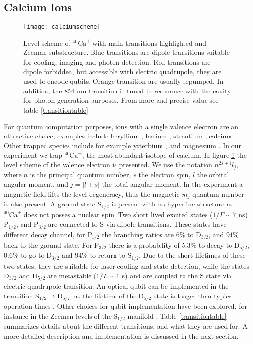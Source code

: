 \subsection{Calcium Ions}
\label{sec:calciumion}
\begin{figure}
\centering
\texttt{[image: calciumscheme]}
\caption{Level scheme of $^{40}\text{Ca}^+$ with main transitions highlighted and Zeeman substructure. Blue transitions are dipole transitions suitable for cooling, imaging and photon detection. Red transitions are dipole forbidden, but accessible with electric quadrupole, they are used to encode qubits. Orange transition are usually repumped. In addition, the 854 nm transition is tuned in resonance with the cavity for photon generation purposes. From more and precise value see table \ref{transitiontable}}
\label{calciumscheme}
\end{figure}
For quantum computation purposes, ions with a single valence electron are an attractive choice, examples include beryllium \cite{beryllium}, barium \cite{barium}, strontium \cite{strontium}, calcium \cite{calcium}. Other trapped species include for example ytterbium \cite{PhysRevA.44.R20}, and magnesium \cite{magnesium}. In our experiment we trap $^{40}\text{Ca}^+$, the most abundant isotope of calcium. In figure \ref{calciumscheme} the level scheme of the valence electron is presented. We use the notation $n^{2s+1}l_j$, where $n$ is the principal quantum number, $s$ the electron spin, $l$ the orbital angular moment, and $j = |l\pm s|$ the total angular moment. In the experiment a magnetic field lifts the level degeneracy, thus the magnetic $m_j$ quantum number is also present. A ground state $\text{S}_{1/2}$ is present with no hyperfine structure as $^{40}\text{Ca}^+$ does not posses a nuclear spin. Two short lived excited states ($1/\Gamma \sim 7$ ns) $\text{P}_{1/2}$, and $\text{P}_{3/2}$ are connected to S via dipole transitions. These states have different decay channel, for $\text{P}_{1/2}$ the branching ratios are $6\%$ to $\text{D}_{3/2}$, and $94\%$ back to the ground state.
For $\text{P}_{3/2}$ there is a probability of $5.3\%$ to decay to $\text{D}_{5/2}$, $0.6\%$ to go to  $\text{D}_{3/2}$ and $94\%$ to return to  $\text{S}_{1/2}$. Due to the short lifetimes of these two states, they are suitable for laser cooling and state detection, while the states $\text{D}_{3/2}$ and $\text{D}_{5/2}$
are metastable ($ 1/\Gamma \sim 1$ s) and are coupled to the S state via electric quadrupole transition. An optical qubit can be implemented in the transition $\text{S}_{1/2} \to \text{D}_{5/2}$, as the lifetime of the $\text{D}_{5/2}$ state is longer than typical operation times \cite{calciumqubit}. Other choices for qubit implementation have been explored, for instance in the Zeeman levels of the $\text{S}_{1/2}$ manifold \cite{Ruster2016}. Table \ref{transitiontable} summarizes details about the different transitions, and what they are used for. A more detailed description and implementation is discussed in the next section.

